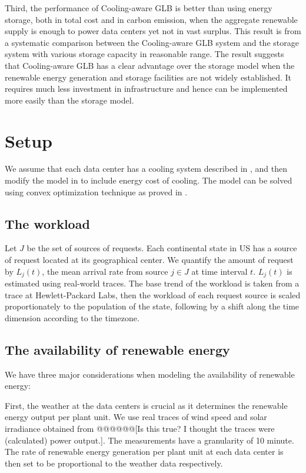 \documentclass{acm_proc_article-sp}
\begin{document}
Third, the performance of Cooling-aware GLB is better than using energy storage, both in total cost and in carbon emission, when the aggregate renewable supply is enough to power data centers yet not in vast surplus. This result is from a systematic comparison between the Cooling-aware GLB system and the storage system with various storage capacity in reasonable range. The result suggests that Cooling-aware GLB has a clear advantage over the storage model when the renewable energy generation and storage facilities are not widely established. It requires much less investment in infrastructure and hence can be implemented more easily than the storage model.



\section{Setup}
We assume that each data center has a cooling system described in \cite{adam:cooling}, and then modify the model in \cite{adam:GLB} to include energy cost of cooling. The model can be solved using convex optimization technique as proved in \cite{adam:GLBfull}.
\subsection{The workload}
Let $J$ be the set of sources of requests. Each continental state in US has a source of request located at its geographical center. We quantify the amount of request by $L_j(t)$, the mean arrival rate from source $j \in J$ at time interval $t$. $L_j(t)$ is estimated using real-world traces. The base trend of the workload is taken from a trace at Hewlett-Packard Labs, then the workload of each request source is scaled proportionately to the population of the state, following by a shift along the time dimension according to the timezone.

    
\subsection{The availability of renewable energy}
We have three major considerations when modeling the availability of renewable energy:  

First, the weather at the data centers is crucial as it determines the renewable energy output per plant unit. We use real traces of wind speed and solar irradiance obtained from \cite{renew1} \cite{renew2} @@@@@@[Is this true? I thought the traces were (calculated) power output.]. The measurements have a granularity of 10 minute. The rate of renewable energy generation per plant unit at each data center is then set to be proportional to the weather data respectively.
\end{document}

